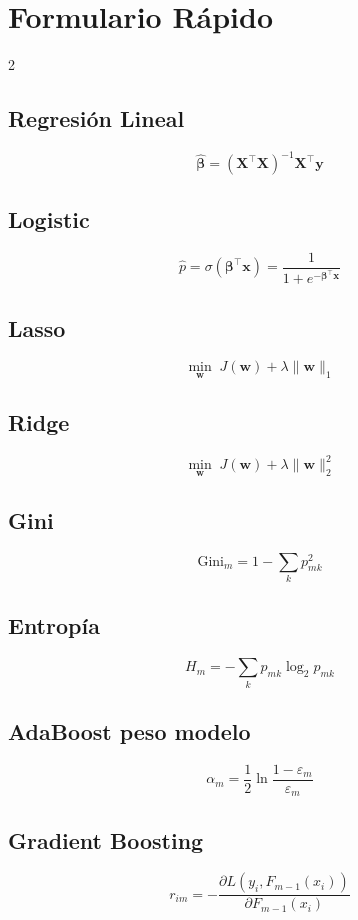 \documentclass[12pt, a4paper]{article}
\begin{document}
\appendix
\section{Formulario Rápido}

\begin{multicols}{2}
\subsection*{Regresión Lineal}
\[
  \hat{\bm{\beta}} = (\mathbf{X}^\top\mathbf{X})^{-1}\mathbf{X}^\top\mathbf{y}
\]

\subsection*{Logistic}
\[
  \hat{p} = \sigma(\bm{\beta}^\top\mathbf{x}) = \frac{1}{1+e^{-\bm{\beta}^\top\mathbf{x}}}
\]

\subsection*{Lasso}
\[
  \min_{\mathbf{w}}\; J(\mathbf{w}) + \lambda\|\mathbf{w}\|_1
\]

\subsection*{Ridge}
\[
  \min_{\mathbf{w}}\; J(\mathbf{w}) + \lambda\|\mathbf{w}\|_2^2
\]

\subsection*{Gini}
\[
  \text{Gini}_m = 1 - \sum_k p_{mk}^2
\]

\subsection*{Entropía}
\[
  H_m = -\sum_k p_{mk}\log_2 p_{mk}
\]

\subsection*{AdaBoost peso modelo}
\[
  \alpha_m = \frac{1}{2}\ln\frac{1-\varepsilon_m}{\varepsilon_m}
\]

\subsection*{Gradient Boosting}
\[
  r_{im} = -\frac{\partial L(y_i, F_{m-1}(x_i))}{\partial F_{m-1}(x_i)}
\]


\end{multicols}
\end{document}
